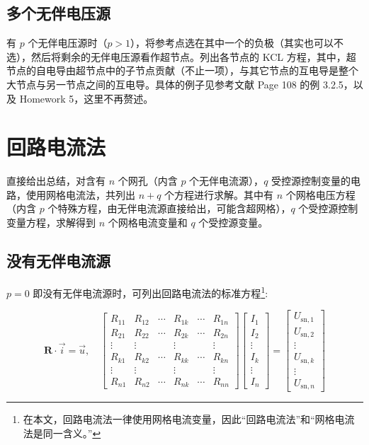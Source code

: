 \documentclass[UTF8]{report}
\def\R{\mathbb{R}}
\def\I{\mathscr{I}}
\theoremstyle{MyLineTheoremStyle} %
\theoremstyle{MyBlockTheoremStyle} %
\theoremstyle{MySubsubsectionStyle} %
\begin{document}
\subsection{多个无伴电压源}

有 $p$ 个无伴电压源时（$p>1$），将参考点选在其中一个的负极（其实也可以不选），然后将剩余的无伴电压源看作超节点。列出各节点的 KCL 方程，其中，超节点的自电导由超节点中的子节点贡献（不止一项），与其它节点的互电导是整个大节点与另一节点之间的互电导。具体的例子见参考文献 \cite{电路原理} Page 108 的例 3.2.5，以及 Homework 5，这里不再赘述。


\section{回路电流法}

直接给出总结，对含有 $n$ 个网孔（内含 $p$ 个无伴电流源），$q$ 受控源控制变量的电路，使用网格电流法，共列出 $n + q$ 个方程进行求解。其中有 $n$ 个网格电压方程（内含 $p$ 个特殊方程，由无伴电流源直接给出，可能含超网格），$q$ 个受控源控制变量方程，求解得到 $n$ 个网格电流变量和 $q$ 个受控源变量。

\subsection{没有无伴电流源}

$p=0$ 即没有无伴电流源时，可列出回路电流法的标准方程\footnote{在本文，回路电流法一律使用网格电流变量，因此“回路电流法”和“网格电流法是同一含义。”}: 

\begin{equation}
    \boldsymbol{R}\cdot \vec{i} = \vec{u},\quad 
    \begin{bmatrix}
        R_{11}&R_{12}&\cdots&R_{1k}&\cdots&R_{1n}\\R_{21}&R_{22}&\cdots&R_{2k}&\cdots&R_{2n}\\\vdots&\vdots&&\vdots&&\vdots\\R_{k1}&R_{k2}&\cdots&R_{kk}&\cdots&R_{kn}\\\vdots&\vdots&&\vdots&&\vdots\\R_{n1}&R_{n2}&\cdots&R_{nk}&\cdots&R_{nn}\end{bmatrix}\begin{bmatrix}I_{1}\\I_{2}\\\vdots\\I_{k}\\\vdots\\I_{n}\end{bmatrix}=\begin{bmatrix}U_{\text{sn},1}\\U_{\text{sn},2}\\\vdots\\U_{\text{sn},k}\\\vdots\\U_{\text{sn},n}
    \end{bmatrix}
\end{equation}
\end{document}
